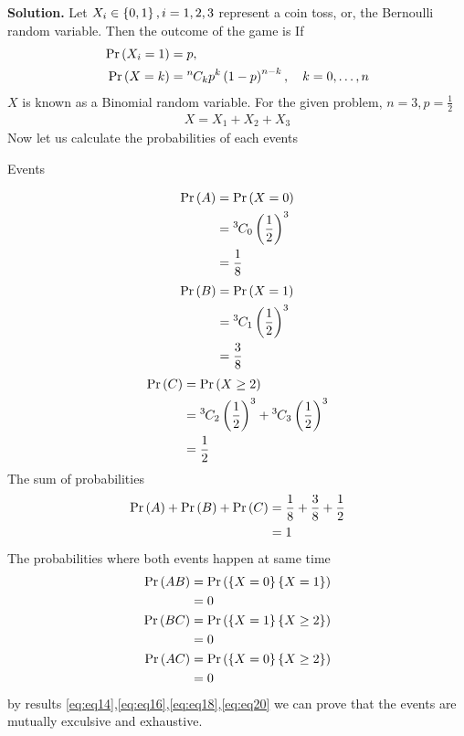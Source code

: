 \documentclass[journal,12pt,twocolumn]{IEEEtran}
\begin{document}
	\textbf{Solution.}
	Let $X_i\in \left\{0,1\right\}, i = 1, 2, 3$ represent a coin toss, or, the Bernoulli random variable.  Then the outcome of the game is
	If 
	\begin{align}
		\Pr\left(X_i = 1\right) &= p,
		\\
		\Pr\left(X = k\right) &= {{}^{n}\mkern-1muC_{k}}p^k\left(1-p\right)^{n-k}, \quad k = 0,\dots, n
	\end{align}
	$X$ is known as a Binomial random variable.  For the given problem, $n = 3, p = \frac{1}{2}$
		\begin{align}
		X = X_1+X_2+X_3	
	\end{align}
Now let us calculate the probabilities of each events
	\begin{table}[ht!]
		\centering
		
		\caption{Events}
		\label{Table:1}
	\end{table}
	\begin{align}
		\Pr\left(A\right)&=\Pr\left(X=0\right)
		\\
	     	  &={{}^{3}\mkern-1muC_{0}}\left(\frac{1}{2}\right)^3 
	     	  \\
	     	  &=\frac{1}{8}
	\end{align}
	\begin{align}     	  	
	    \Pr\left(B\right)&=\Pr\left(X=1\right)\\
	          &={{}^{3}\mkern-1muC_{1}}\left(\frac{1}{2}\right)^3 \\
	          &=\frac{3}{8}
	\end{align}
	\begin{align}	          		        
	    \Pr\left(C\right)&= \Pr\left(X \ge 2\right) \\
	    &= {{}^{3}\mkern-1muC_{2}}\left(\frac{1}{2}\right)^3+{{}^{3}\mkern-1muC_{3}}\left(\frac{1}{2}\right)^3
	    \\
	    &= \frac{1}{2}
	\end{align}
    The sum of probabilities
    \begin{align}
	    \Pr\left(A\right)+\Pr\left(B\right)+\Pr\left(C\right)&=\frac{1}{8}+\frac{3}{8}+ \frac{1}{2}\\
	                        &=1\label{eq:eq14}
	\end{align}
The probabilities where both events happen at same time
\begin{align}
	\Pr\left(AB\right)&=\Pr\left(\left\{X=0\right\}\left\{X=1\right\}\right)\\
	       &=0\label{eq:eq16}\\
	 \Pr\left(BC\right)&=\Pr\left(\left\{X=1\right\}\left\{X\ge2\right\}\right)\\
	 &=0\label{eq:eq18}\\
	 \Pr\left(AC\right)&=\Pr\left(\left\{X=0\right\}\left\{X\ge2\right\}\right)\\
	 &=0\label{eq:eq20}
\end{align}
	by results \eqref{eq:eq14},\eqref{eq:eq16},\eqref{eq:eq18},\eqref{eq:eq20}
	we can prove that the events are mutually exculsive and exhaustive.
\end{document}
